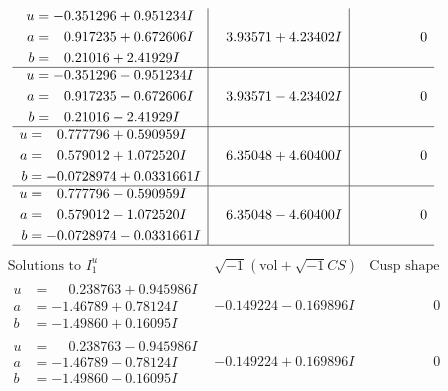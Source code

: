 \documentclass[1p]{elsarticle_modified}
\theoremstyle{definition}
\newcommand{\I}{\sqrt{-1}}
\begin{document}
$$\begin{array}{c|c|c}
\begin{aligned}
u &= -0.351296 + 0.951234 I \\
a &= \phantom{-}0.917235 + 0.672606 I \\
b &= \phantom{-}0.21016 + 2.41929 I\end{aligned}
 & \phantom{-}3.93571 + 4.23402 I & \phantom{-0.000000 } 0 \\ \hline\begin{aligned}
u &= -0.351296 - 0.951234 I \\
a &= \phantom{-}0.917235 - 0.672606 I \\
b &= \phantom{-}0.21016 - 2.41929 I\end{aligned}
 & \phantom{-}3.93571 - 4.23402 I & \phantom{-0.000000 } 0 \\ \hline\begin{aligned}
u &= \phantom{-}0.777796 + 0.590959 I \\
a &= \phantom{-}0.579012 + 1.072520 I \\
b &= -0.0728974 + 0.0331661 I\end{aligned}
 & \phantom{-}6.35048 + 4.60400 I & \phantom{-0.000000 } 0 \\ \hline\begin{aligned}
u &= \phantom{-}0.777796 - 0.590959 I \\
a &= \phantom{-}0.579012 - 1.072520 I \\
b &= -0.0728974 - 0.0331661 I\end{aligned}
 & \phantom{-}6.35048 - 4.60400 I & \phantom{-0.000000 } 0\\
 \hline 
 \end{array}$$\newpage$$\begin{array}{c|c|c}  
\text{Solutions to }I^u_{1}& \I (\text{vol} + \sqrt{-1}CS) & \text{Cusp shape}\\
 \hline 
\begin{aligned}
u &= \phantom{-}0.238763 + 0.945986 I \\
a &= -1.46789 + 0.78124 I \\
b &= -1.49860 + 0.16095 I\end{aligned}
 & -0.149224 - 0.169896 I & \phantom{-0.000000 } 0 \\ \hline\begin{aligned}
u &= \phantom{-}0.238763 - 0.945986 I \\
a &= -1.46789 - 0.78124 I \\
b &= -1.49860 - 0.16095 I\end{aligned}
 & -0.149224 + 0.169896 I & \phantom{-0.000000 } 0 \\ \hline\begin{aligned}

\end{aligned}
\end{array}$$
\end{document}
